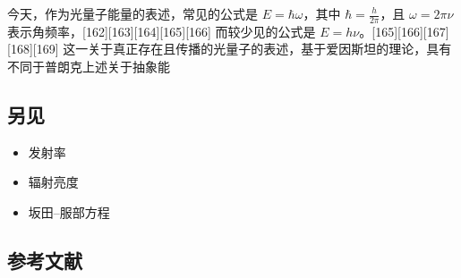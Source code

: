 今天，作为光量子能量的表述，常见的公式是 \( E = \hbar \omega \)，其中 \( \hbar = \frac{h}{2\pi} \)，且 \( \omega = 2\pi\nu \) 表示角频率，[162][163][164][165][166] 而较少见的公式是 \( E = h\nu \)。[165][166][167][168][169] 这一关于真正存在且传播的光量子的表述，基于爱因斯坦的理论，具有不同于普朗克上述关于抽象能
\subsection{另见}  
\begin{itemize}
\item 发射率  
\item 辐射亮度  
\item 坂田–服部方程
\end{itemize}
\subsection{参考文献}  

